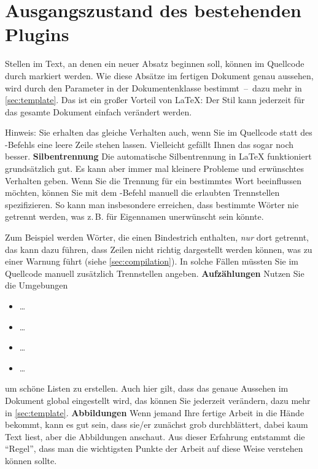 \section{Ausgangszustand des bestehenden Plugins}
Stellen im Text, an denen ein neuer Absatz beginnen soll, können im Quellcode durch  markiert werden. Wie diese Absätze im fertigen Dokument genau aussehen, wird durch den Parameter  in der Dokumentenklasse bestimmt~--~dazu mehr in \cref{sec:template}. Das ist ein großer Vorteil von \LaTeX{}: Der Stil kann jederzeit für das gesamte Dokument einfach verändert werden.
\par
Hinweis: Sie erhalten das gleiche Verhalten auch, wenn Sie im Quellcode statt des -Befehls eine leere Zeile stehen lassen. Vielleicht gefällt Ihnen das sogar noch besser.
%
%
\textbf{Silbentrennung}
\label{sec:hyphenation}
Die automatische Silbentrennung in \LaTeX{} funktioniert grundsätzlich gut. Es kann aber immer mal kleinere Probleme und erwünschtes Verhalten geben. Wenn Sie die Trennung für ein bestimmtes Wort beeinflussen möchten, können Sie mit dem -Befehl manuell die erlaubten Trennstellen spezifizieren. So kann man insbesondere erreichen, dass bestimmte Wörter nie getrennt werden, was z.\,B. für Eigennamen unerwünscht sein könnte.
\par
Zum Beispiel werden Wörter, die einen Bindestrich enthalten, \emph{nur} dort getrennt, das kann dazu führen, dass Zeilen nicht richtig dargestellt werden können, was zu einer Warnung führt (siehe \cref{sec:compilation}). In solche Fällen müssten Sie im Quellcode manuell zusätzlich Trennstellen angeben.
%
%
\textbf{Aufzählungen}
Nutzen Sie die Umgebungen
%
\begin{itemize}
 \item {} \ldots {}
 \item {} \ldots {}
 \item {} \ldots {}
 \item {} \ldots {}
\end{itemize}
%
um schöne Listen zu erstellen. Auch hier gilt, dass das genaue Aussehen im Dokument global eingestellt wird, das können Sie jederzeit verändern, dazu mehr in \cref{sec:template}.
%
%
\textbf{Abbildungen}
\label{sec:figures}
%
Wenn jemand Ihre fertige Arbeit in die Hände bekommt, kann es gut sein, dass sie/er zunächst grob durchblättert, dabei kaum Text liest, aber die Abbildungen anschaut. Aus dieser Erfahrung entstammt die \enquote{Regel}, dass man die wichtigsten Punkte der Arbeit auf diese Weise verstehen können sollte.
